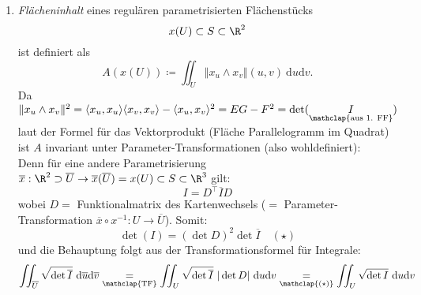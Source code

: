 \begin{remark}
\begin{enumerate}
  \item \emph{Flächeninhalt} eines regulären parametrisierten Flächenstücks
  \begin{equation*}
    x(U) \subset S \subset \R^2
  \end{equation*}
  ist definiert als
  \begin{equation*}
    A(x(U)) \coloneqq \iint_U \Vert x_u \wedge x_v \Vert (u,v) \ \text{d}u\text{d}v\text{.}
  \end{equation*}
  Da \( \Vert x_u \wedge x_v \Vert^2 = \langle x_u, x_u \rangle \langle x_v,x_v \rangle - \langle x_u, x_v \rangle^2 = EG - F^2 = \det(\underset{\mathclap{\text{aus 1. FF}}}{I}) \) laut der Formel für das Vektorprodukt (Fläche Parallelogramm im Quadrat) ist \( A \) invariant unter Parameter-Transformationen (also wohldefiniert): \\
  Denn für eine andere Parametrisierung \( \overline{x}: \R^2 \supset \overline{U} \to \overline{x}(\overline{U}) = x(U) \subset S \subset \R^3 \) gilt:
  \begin{equation*}
    I = D^\top \overline{I} D
  \end{equation*}
  wobei \( D = \) Funktionalmatrix des Kartenwechsels (\( = \) Parameter-Transformation \( \overline{x} \circ x^{-1} : U \to \overline{U} \)). Somit:
  \begin{equation*}
    \det(I) = {\left( \det D \right)}^2 \det \overline{I} \quad (\star)
  \end{equation*}
  und die Behauptung folgt aus der Transformationsformel für Integrale:
  \begin{equation*}
    \iint_{\overline{U}} \sqrt{\det \overline{I}} \ \text{d}\overline{u}\text{d}\overline{v} \underset{\mathclap{\text{TF}}}{=} \iint_U \sqrt{\det \overline{I}} \ \vert \det D \vert \ \text{d}u\text{d}v \underset{\mathclap{(\star)}}{=} \iint_U \sqrt{\det I} \ \text{d}u\text{d}v
  \end{equation*}
 \end{enumerate}
\end{remark}

